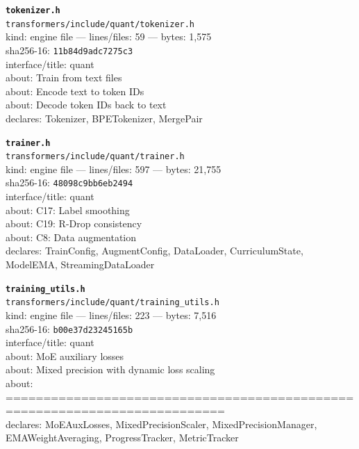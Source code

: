 \noindent\textbf{\texttt{tokenizer.h}}\\
\texttt{transformers/include/quant/tokenizer.h}\\
kind: engine file --- lines/files: 59 --- bytes: 1,575\\
sha256-16: \texttt{11b84d9adc7275c3}\\
interface/title: quant\\
about: Train from text files\\
about: Encode text to token IDs\\
about: Decode token IDs back to text\\
declares: Tokenizer, BPETokenizer, MergePair\\
\vspace*{6.0pt}

\noindent\textbf{\texttt{trainer.h}}\\
\texttt{transformers/include/quant/trainer.h}\\
kind: engine file --- lines/files: 597 --- bytes: 21,755\\
sha256-16: \texttt{48098c9bb6eb2494}\\
interface/title: quant\\
about: C17: Label smoothing\\
about: C19: R-Drop consistency\\
about: C8: Data augmentation\\
declares: TrainConfig, AugmentConfig, DataLoader, CurriculumState, ModelEMA, StreamingDataLoader\\
\vspace*{6.0pt}

\noindent\textbf{\texttt{training\_utils.h}}\\
\texttt{transformers/include/quant/training\_utils.h}\\
kind: engine file --- lines/files: 223 --- bytes: 7,516\\
sha256-16: \texttt{b00e37d23245165b}\\
interface/title: quant\\
about: MoE auxiliary losses\\
about: Mixed precision with dynamic loss scaling\\
about: ===========================================================================\\
declares: MoEAuxLosses, MixedPrecisionScaler, MixedPrecisionManager, EMAWeightAveraging, ProgressTracker, MetricTracker\\
\vspace*{6.0pt}
\newpage

